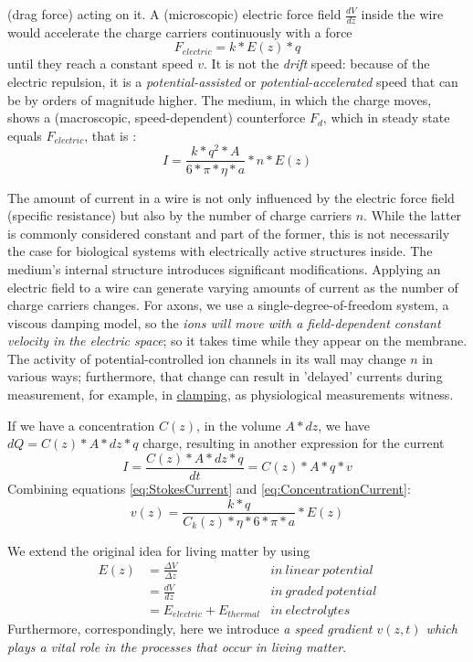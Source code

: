 (drag force) acting on it. A (microscopic) electric force
field $\frac{dV}{dz}$ inside the wire would accelerate the charge
carriers continuously with a force
%
\begin{equation}
F_{electric}=k* E(z) * q
\end{equation}
\noindent until they reach a constant speed $v$. It is not the \emph{drift} speed: because of the
electric repulsion, it is a \emph{potential-assisted} or \emph{potential-accelerated} speed that can
be by orders of magnitude higher.  
The medium, in which the charge moves, shows a (macroscopic,
speed-dependent) counterforce $F_{d}$, which in steady state equals
$F_{electric}$, that is :
%
\begin{equation}
I=\frac{k*q^{2}*A}{6*\pi*\eta*a}*n*E(z)
\label{eq:StokesCurrent}
\end{equation}


The amount of current in a wire is not only influenced by the electric
force field (specific resistance) but also by the number of charge
carriers $n$. While the latter is commonly considered constant and
part of the former, this is not necessarily the case for biological
systems with electrically active structures inside. The medium's internal
structure introduces significant modifications. Applying an electric
field to a wire can generate varying amounts of current as the number
of charge carriers changes. For axons, we use a single-degree-of-freedom
system, a viscous damping model, so the \textit{ions will move with
a field-dependent constant velocity in the electric space}; so it takes time while they appear on the membrane.
The activity of potential-controlled ion channels in its wall may
change $n$ in various ways; furthermore, that change can result in
'delayed' currents during measurement, for example, in \hyperlink{voltage-clamping}{clamping}, as physiological measurements witness.

{
If we have a concentration
$C(z)$, in the volume $A*dz$, we have $dQ=C(z)*A*dz*q$
charge, resulting in another expression for the current
%
\begin{equation}
	I=\frac{C(z)*A*dz*q}{dt}=C(z)*A*q*v\label{eq:ConcentrationCurrent}
\end{equation}
Combining equations \ref{eq:StokesCurrent} and \ref{eq:ConcentrationCurrent}: 
\hypertarget{eq:StokesLawSpeed}{ }
\begin{equation}
	v(z)=\frac{k*q}{C_k(z)*\eta*6*\pi*a}*E(z)\label{eq:StokesSpeed}
\end{equation}

We extend the original idea for living matter by using
\begin{align}
	E(z) & = \frac{\Delta V}{\Delta z} & in\ linear\ potential\\
	     & = \frac{dV}{dz} & in\ graded\ potential\\
	     & = E_{electric} + E_{thermal} & in\ electrolytes
\end{align}
Furthermore, correspondingly, here we introduce \textit{a speed gradient $v(z,t)$
which plays a vital role in the processes that occur in living matter}.
}

